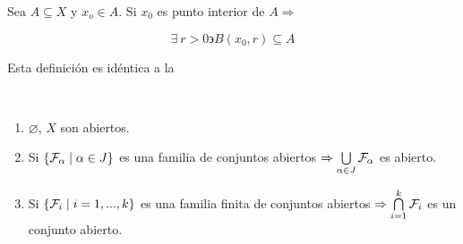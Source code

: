 \begin{definition}
    Sea $A \subseteq X$ y ${x}_{o} \in A$. Si ${x}_{0}$ es punto interior de $A \Rightarrow $ 

    \begin{equation*}
        \exists \: r > 0 \backepsilon {B}({x}_{0}, r) \subseteq A
    \end{equation*}
\end{definition}

\begin{remark}
    Esta definición es idéntica a la 
\end{remark}

\begin{theorem} \label{theom223}
\
    \begin{enumerate}
        \item $\varnothing$, $X$ son abiertos.
        \item Si $\{ {\mathcal{F}}_{\alpha} \mid \alpha \in J \}$ es una familia de conjuntos abiertos $\Rightarrow \bigcup\limits_{\alpha \in J} {\mathcal{F}}_{\alpha}$ 
        es abierto.
        \item Si $\{ {\mathcal{F}}_{i} \mid i=1,...,k \}$ es una familia finita de conjuntos abiertos $\Rightarrow  \bigcap\limits_{i=1}^{k}{\mathcal{F}}_{i}$ es un conjunto abierto. 
    \end{enumerate}
\end{theorem}

